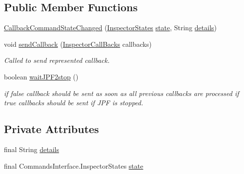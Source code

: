 \subsection*{Public Member Functions}
\begin{DoxyCompactItemize}
\item 
\hyperlink{classgov_1_1nasa_1_1jpf_1_1inspector_1_1server_1_1callbacks_1_1commands_1_1_callback_command_state_changed_ac3a1afd71f49ca58292e8496690138f6}{Callback\+Command\+State\+Changed} (\hyperlink{enumgov_1_1nasa_1_1jpf_1_1inspector_1_1interfaces_1_1_commands_interface_1_1_inspector_states}{Inspector\+States} \hyperlink{classgov_1_1nasa_1_1jpf_1_1inspector_1_1server_1_1callbacks_1_1commands_1_1_callback_command_state_changed_af2e5e8e2807deb2d791faa4ae388ae5c}{state}, String \hyperlink{classgov_1_1nasa_1_1jpf_1_1inspector_1_1server_1_1callbacks_1_1commands_1_1_callback_command_state_changed_a0ad578b5a96d82d7543ac53157746dab}{details})
\item 
void \hyperlink{classgov_1_1nasa_1_1jpf_1_1inspector_1_1server_1_1callbacks_1_1commands_1_1_callback_command_state_changed_a2d5ba3e613f89a44e500b949dbbd8130}{send\+Callback} (\hyperlink{interfacegov_1_1nasa_1_1jpf_1_1inspector_1_1interfaces_1_1_inspector_call_backs}{Inspector\+Call\+Backs} callbacks)
\begin{DoxyCompactList}\small\item\em Called to send represented callback. \end{DoxyCompactList}\item 
boolean \hyperlink{classgov_1_1nasa_1_1jpf_1_1inspector_1_1server_1_1callbacks_1_1commands_1_1_callback_command_state_changed_a7e6e83514e98395c3b1a63265980967d}{wait\+J\+P\+F2stop} ()
\begin{DoxyCompactList}\small\item\em if false callback should be sent as soon as all previous callbacks are processed if true callbacks should be sent if J\+PF is stopped. \end{DoxyCompactList}\end{DoxyCompactItemize}
\subsection*{Private Attributes}
\begin{DoxyCompactItemize}
\item 
final String \hyperlink{classgov_1_1nasa_1_1jpf_1_1inspector_1_1server_1_1callbacks_1_1commands_1_1_callback_command_state_changed_a0ad578b5a96d82d7543ac53157746dab}{details}
\item 
final Commands\+Interface.\+Inspector\+States \hyperlink{classgov_1_1nasa_1_1jpf_1_1inspector_1_1server_1_1callbacks_1_1commands_1_1_callback_command_state_changed_af2e5e8e2807deb2d791faa4ae388ae5c}{state}
\end{DoxyCompactItemize}


